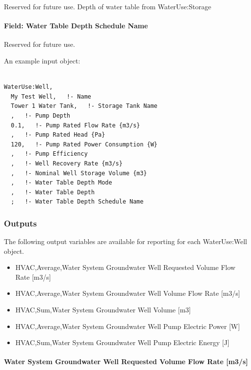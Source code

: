 Reserved for future use. Depth of water table from WaterUse:Storage

\paragraph{Field: Water Table Depth Schedule Name}\label{field-water-table-depth-schedule-name}

Reserved for future use.

An example input object:

\begin{lstlisting}

WaterUse:Well,
  My Test Well,   !- Name
  Tower 1 Water Tank,   !- Storage Tank Name
  ,   !- Pump Depth
  0.1,   !- Pump Rated Flow Rate {m3/s}
  ,   !- Pump Rated Head {Pa}
  120,   !- Pump Rated Power Consumption {W}
  ,   !- Pump Efficiency
  ,   !- Well Recovery Rate {m3/s}
  ,   !- Nominal Well Storage Volume {m3}
  ,   !- Water Table Depth Mode
  ,   !- Water Table Depth
  ;   !- Water Table Depth Schedule Name
\end{lstlisting}

\subsubsection{Outputs}\label{outputs-4-019}

The following output variables are available for reporting for each WaterUse:Well object.

\begin{itemize}
\item
  HVAC,Average,Water System Groundwater Well Requested Volume Flow Rate {[}m3/s{]}
\item
  HVAC,Average,Water System Groundwater Well Volume Flow Rate {[}m3/s{]}
\item
  HVAC,Sum,Water System Groundwater Well Volume {[}m3{]}
\item
  HVAC,Average,Water System Groundwater Well Pump Electric Power {[}W{]}
\item
  HVAC,Sum,Water System Groundwater Well Pump Electric Energy {[}J{]}
\end{itemize}

\paragraph{Water System Groundwater Well Requested Volume Flow Rate {[}m3/s{]}}\label{water-system-groundwater-well-requested-volume-flow-rate-m3s}

